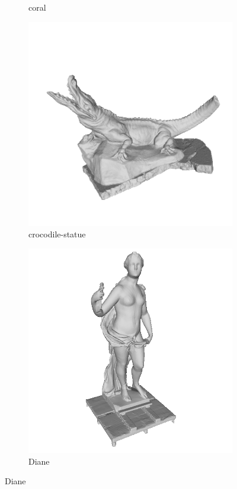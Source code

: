 \begin{figure}[!h]
\begin{subfigure}[b]{0.23\linewidth}
		\caption{coral}
	\end{subfigure}
	\begin{subfigure}[b]{0.23\linewidth}
		\includegraphics[width=\linewidth]{./Figures/train-dataset/14.crocodile-statue.png}
		\caption{crocodile-statue}
	\end{subfigure}
	\begin{subfigure}[b]{0.23\linewidth}
		\includegraphics[width=\linewidth]{./Figures/train-dataset/15.diane.png}
		\caption{Diane}
	\end{subfigure}


\end{figure}
